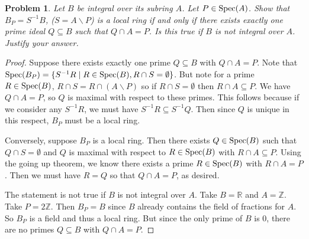 \documentclass{article}
\newcommand{\spec}{\textup{Spec}}
\newtheorem{problem}{Problem}
\begin{document}
\begin{problem}
Let $B$ be integral over its subring $A$. Let $P \in \spec(A)$. Show that $B_P = S^{-1}B$, ($S = A \backslash P$) is a local ring if and only if there exists exactly one prime ideal $Q \subseteq B$ such that $Q \cap A = P$. Is this true if $B$ is \emph{not} integral over $A$. Justify your answer.
\end{problem}
\begin{proof}
Suppose there exists exactly one prime $Q \subseteq B$ with $Q \cap A = P$. Note that $\spec(B_P) = \{S^{-1}R \mid R \in \spec(B), R \cap S = \emptyset\}$. But note for a prime $R \in \spec(B)$, $R \cap S = R \cap (A \backslash P)$ so if $R \cap S = \emptyset$ then $R \cap A \subseteq P$. We have $Q \cap A = P$, so $Q$ is maximal with respect to these primes. This follows because if we consider any $S^{-1}R$, we must have $S^{-1}R \subseteq S^{-1}Q$.  Then since $Q$ is unique in this respect, $B_P$ must be a local ring.

Conversely, suppose $B_P$ is a local ring. Then there exists $Q \in \spec(B)$ such that $Q \cap S = \emptyset$ and $Q$ is maximal with respect to $R \in \spec(B)$ with $R \cap A \subseteq P$. Using the going up theorem, we know there exists a prime $R \in \spec(B)$ with $R \cap A = P$. Then we must have $R = Q$ so that $Q \cap A = P$, as desired.

The statement is not true if $B$ is not integral over $A$. Take $B = \mathbb{R}$ and $A = \mathbb{Z}$. Take $P = 2\mathbb{Z}$. Then $B_P = B$ since $B$ already contains the field of fractions for $A$. So $B_P$ is a field and thus a local ring. But since the only prime of $B$ is $0$, there are no primes $Q \subseteq B$ with $Q \cap A = P$.
\end{proof}
\end{document}
